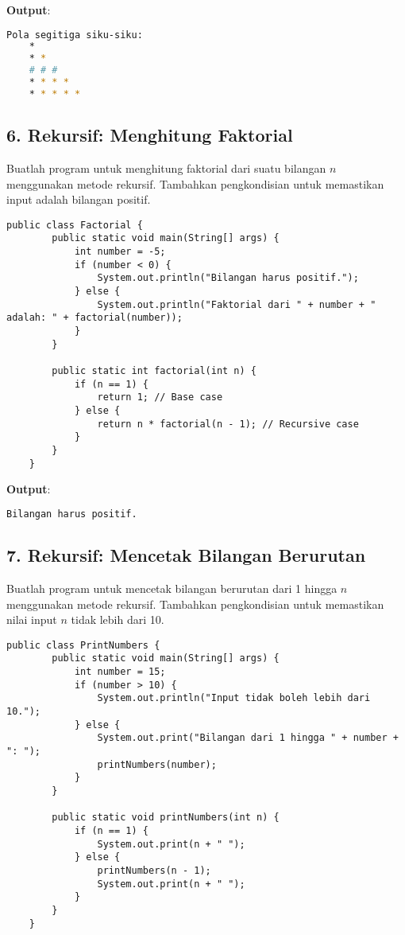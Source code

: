 \textbf{Output}:
\begin{lstlisting}[language=bash]
	Pola segitiga siku-siku:
	* 
	* * 
	# # # 
	* * * * 
	* * * * * 
\end{lstlisting}

\subsection{6. Rekursif: Menghitung Faktorial}
Buatlah program untuk menghitung faktorial dari suatu bilangan \( n \) menggunakan metode rekursif. Tambahkan pengkondisian untuk memastikan input adalah bilangan positif.

\begin{lstlisting}[style=JavaStyle]
	public class Factorial {
		public static void main(String[] args) {
			int number = -5;
			if (number < 0) {
				System.out.println("Bilangan harus positif.");
			} else {
				System.out.println("Faktorial dari " + number + " adalah: " + factorial(number));
			}
		}
		
		public static int factorial(int n) {
			if (n == 1) {
				return 1; // Base case
			} else {
				return n * factorial(n - 1); // Recursive case
			}
		}
	}
\end{lstlisting}

\textbf{Output}:
\begin{lstlisting}[language=bash]
	Bilangan harus positif.
\end{lstlisting}

\subsection{7. Rekursif: Mencetak Bilangan Berurutan}
Buatlah program untuk mencetak bilangan berurutan dari 1 hingga \( n \) menggunakan metode rekursif. Tambahkan pengkondisian untuk memastikan nilai input \( n \) tidak lebih dari 10.

\begin{lstlisting}[style=JavaStyle]
	public class PrintNumbers {
		public static void main(String[] args) {
			int number = 15;
			if (number > 10) {
				System.out.println("Input tidak boleh lebih dari 10.");
			} else {
				System.out.print("Bilangan dari 1 hingga " + number + ": ");
				printNumbers(number);
			}
		}
		
		public static void printNumbers(int n) {
			if (n == 1) {
				System.out.print(n + " ");
			} else {
				printNumbers(n - 1);
				System.out.print(n + " ");
			}
		}
	}
\end{lstlisting}

